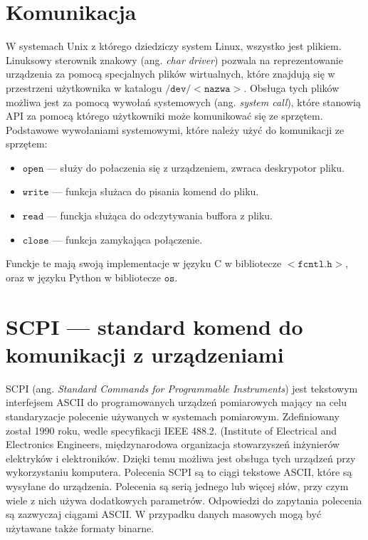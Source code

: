 \documentclass[a4paper, portrait,12pt]{report}
\begin{document}
\section{Komunikacja}
W systemach Unix z którego dziedziczy system Linux, wszystko jest plikiem. Linuksowy sterownik znakowy (ang. \textit{char driver}) pozwala na reprezentowanie urządzenia za pomocą specjalnych plików wirtualnych, które znajdują się w przestrzeni użytkownika w katalogu $\mathtt{/dev/<nazwa>}$. Obsługa tych plików możliwa jest za pomocą wywołań systemowych (ang. \textit{system call}), które stanowią API za pomocą którego użytkowniki może komunikować się ze sprzętem. Podstawowe wywołaniami systemowymi, które należy użyć do komunikacji ze sprzętem:
\begin{itemize}
\item $\mathtt{open}$ --- służy do połaczenia się z urządzeniem, zwraca deskrypotor pliku.
\item $\mathtt{write}$ --- funkcja służaca do pisania komend do pliku.
\item $\mathtt{read}$ --- funckja służąca do odczytywania buffora z pliku.
\item $\mathtt{close}$ --- funkcja zamykająca połączenie.
\end{itemize}
Funckje te mają swoją implementacje w języku C w bibliotecze $<\mathtt{fcntl.h}>$, oraz w języku Python w bibliotecze $\mathtt{os}$.
\section{SCPI --- standard komend do komunikacji z urządzeniami}
SCPI  (ang. \textit{Standard  Commands  for  Programmable  Instruments}) jest tekstowym interfejsem ASCII do programowanych urządzeń pomiarowych mający na celu standaryzacje polecenie używanych w systemach pomiarowym. Zdefiniowany został 1990 roku, wedle specyfikacji IEEE 488.2. (Institute of Electrical and Electronics Engineers, międzynarodowa organizacja stowarzyszeń inżynierów elektryków i elektroników.  Dzięki temu możliwa jest obsługa tych urządzeń przy wykorzystaniu komputera. Polecenia SCPI są to ciągi tekstowe ASCII, które są wysyłane do urządzenia. Polecenia są serią jednego lub więcej słów, przy czym wiele z nich używa dodatkowych parametrów. Odpowiedzi do zapytania polecenia są zazwyczaj ciągami ASCII. W przypadku danych masowych mogą być użytawane także formaty binarne. \\
\end{document}
